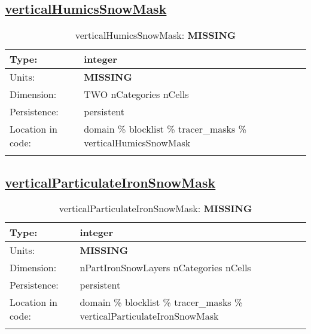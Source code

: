 \subsection[verticalHumicsSnowMask]{\hyperref[sec:var_tab_tracer_masks]{verticalHumicsSnowMask}}
\label{subsec:var_sec_tracer_masks_verticalHumicsSnowMask}
\begin{center}
\begin{longtable}{| p{2.0in} | p{4.0in} |}
        \hline 
        Type: & integer \\
        \hline 
        Units: & {\bf \color{red} MISSING} \\
        \hline 
        Dimension: & TWO nCategories nCells \\
        \hline 
        Persistence: & persistent \\
        \hline 
         Location in code: & domain \% blocklist \% tracer\_masks \% verticalHumicsSnowMask \\
         \hline 
    \caption{verticalHumicsSnowMask: {\bf \color{red} MISSING}}
\end{longtable}
\end{center}
\subsection[verticalParticulateIronSnowMask]{\hyperref[sec:var_tab_tracer_masks]{verticalParticulateIronSnowMask}}
\label{subsec:var_sec_tracer_masks_verticalParticulateIronSnowMask}
\begin{center}
\begin{longtable}{| p{2.0in} | p{4.0in} |}
        \hline 
        Type: & integer \\
        \hline 
        Units: & {\bf \color{red} MISSING} \\
        \hline 
        Dimension: & nPartIronSnowLayers nCategories nCells \\
        \hline 
        Persistence: & persistent \\
        \hline 
         Location in code: & domain \% blocklist \% tracer\_masks \% verticalParticulateIronSnowMask \\
         \hline 
    \caption{verticalParticulateIronSnowMask: {\bf \color{red} MISSING}}
\end{longtable}
\end{center}
